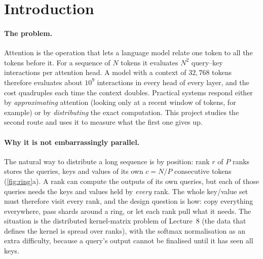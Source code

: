 \documentclass[10pt,a4paper]{article}
\begin{document}
\section{Introduction}\label{sec:intro}

\paragraph{The problem.}
Attention is the operation that lets a language model relate one token to all the
tokens before it. For a sequence of $N$ tokens it evaluates $N^2$ query--key
interactions per attention head. A model with a context of $32{,}768$ tokens
therefore evaluates about $10^9$ interactions in every head of every layer, and the
cost quadruples each time the context doubles. Practical systems respond either by
\emph{approximating} attention (looking only at a recent window of tokens, for
example) or by \emph{distributing} the exact computation. This project studies the
second route and uses it to measure what the first one gives up.

\paragraph{Why it is not embarrassingly parallel.}
The natural way to distribute a long sequence is by position: rank $r$ of $P$ ranks
stores the queries, keys and values of its own $c=N/P$ consecutive tokens
(\cref{fig:ring}a). A rank can compute the outputs of its own queries, but each of
those queries needs the keys and values held by \emph{every} rank. The whole
key/value set must therefore visit every rank, and the design question is how:
copy everything everywhere, pass shards around a ring, or let each rank pull what
it needs. The situation is the distributed kernel-matrix problem of Lecture~8 (the
data that defines the kernel is spread over ranks), with the softmax normalisation
as an extra difficulty, because a query's output cannot be finalised until it has
seen all keys.
\end{document}
